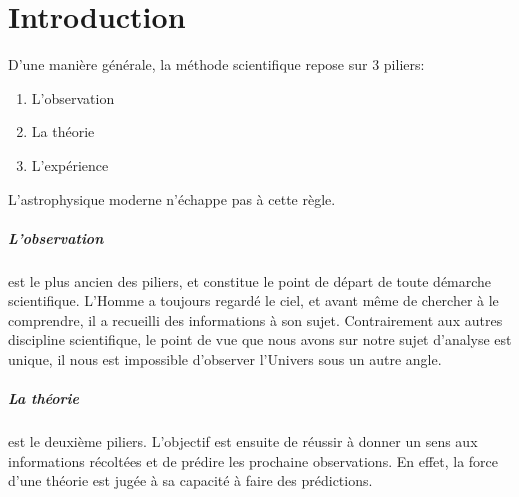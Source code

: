 \chapter{Introduction}

D'une manière générale, la méthode scientifique repose sur 3 piliers: 
\begin{enumerate}
\item L'observation
\item La théorie
\item L'expérience
\end{enumerate}
L'astrophysique moderne n’échappe pas à cette règle.

\paragraph{L'observation} est le plus ancien des piliers, et constitue le point de départ de toute démarche scientifique.
L'Homme a toujours regardé le ciel, et avant même de chercher à le comprendre, il a recueilli des informations à son sujet. %
Contrairement aux autres discipline scientifique, le point de vue que nous avons sur notre sujet d'analyse est unique, il nous est impossible d'observer l'Univers sous un autre angle.


\paragraph{La théorie} est le deuxième piliers.
L'objectif est ensuite de réussir à donner un sens aux informations récoltées et de prédire les prochaine observations.
En effet, la force d'une théorie est jugée à sa capacité à faire des prédictions.


